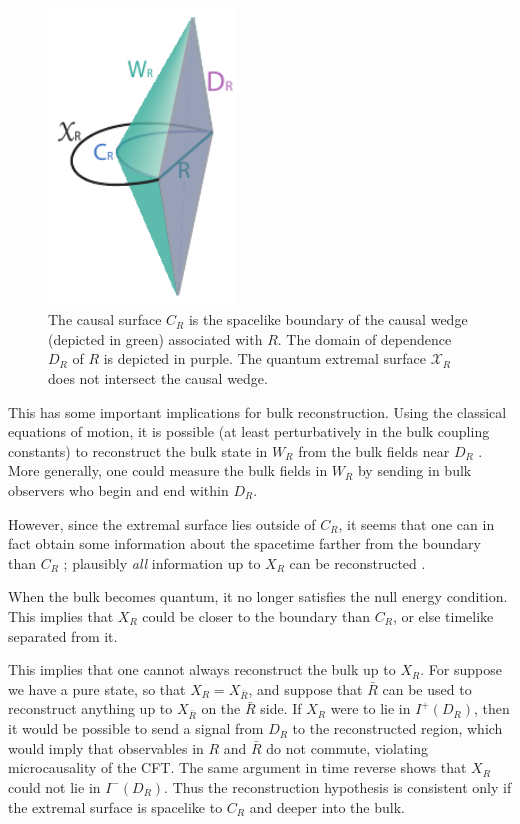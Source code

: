 \documentclass[12pt]{article}
\theoremstyle{remark}
\numberwithin{equation}{section}
\numberwithin{equation}{section}
\begin{document}
\begin{figure}[ht]
\begin{center}
\includegraphics[width=5cm]{CausalSurfacev3.pdf} 
\caption{{\small The causal surface $C_R$ is the spacelike boundary of the causal wedge (depicted in green) associated with $R$. The domain of dependence $D_{R}$ of $R$ is depicted in purple. The quantum extremal surface $\mathcal{X}_{R}$ does not intersect the causal wedge.}}
\label{CS}
\end{center}
\end{figure}

This has some important implications for bulk reconstruction.  Using the classical equations of motion, it is possible (at least perturbatively in the bulk coupling constants) to reconstruct the bulk state in $W_R$ from the bulk fields near $D_R$ \cite{HubenyRangamani, 59, Bousso:2012sj}.  More generally, one could measure the bulk fields in $W_R$ by sending in bulk observers who begin and end within $D_R$.

However, since the extremal surface lies outside of $C_R$, it seems that one can in fact obtain some information about the spacetime farther from the boundary than $C_R$ \cite{HubenyRangamani,Czech:2012bh}; plausibly \emph{all} information up to $X_R$ can be reconstructed \cite{Wall12}.

When the bulk becomes quantum, it no longer satisfies the null energy condition.  This implies that $X_R$ could be closer to the boundary than $C_R$, or else timelike separated from it.

This implies that one cannot always reconstruct the bulk up to $X_R$.  For suppose we have a pure state, so that $X_R = X_{\bar R}$, and suppose that ${\bar R}$ can be used to reconstruct anything up to $X_{\bar R}$ on the ${\bar R}$ side.  If $X_R$ were to lie in $I^+(D_R)$, then it would be possible to send a signal from $D_R$ to the reconstructed region, which would imply that observables in $R$ and ${\bar R}$ do not commute, violating microcausality of the CFT.  The same argument in time reverse shows that $X_R$ could not lie in $I^-(D_R)$.  Thus the reconstruction hypothesis is consistent only if the extremal surface is spacelike to $C_R$ and deeper into the bulk.
\end{document}
